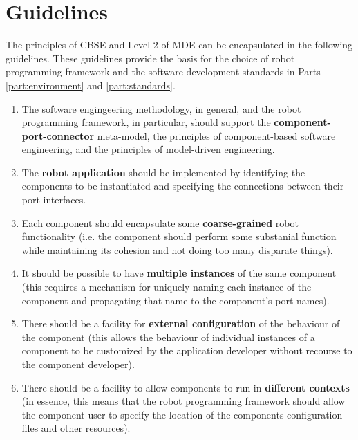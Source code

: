 \documentclass{CSSRforAfrica}
\begin{document}
\newpage

\section{Guidelines}
\label{section:guidelines}
The principles of CBSE and Level 2 of MDE can be encapsulated in the following guidelines.  These guidelines provide the basis for the choice of robot programming framework and the software development standards in Parts \ref{part:environment} and \ref{part:standards}.

\begin{enumerate}

\item The software engingeering methodology, in general, and the robot programming framework, in particular, should support the {\bf component-port-connector} meta-model,  the principles of component-based software engineering, and the principles of model-driven engineering.

\item The {\bf robot application} should be implemented by identifying the components to be instantiated and specifying the connections between their port interfaces.

\item Each component should encapsulate some  {\bf coarse-grained} robot functionality (i.e. the component should perform some substanial function while maintaining its cohesion and not doing too many disparate things).

\item It should be possible to have {\bf multiple instances} of the same component (this requires a mechanism for uniquely naming each instance of the component and propagating that name to the component's port names).

\item There should be a facility for {\bf external configuration} of the behaviour of the component (this allows the behaviour of individual instances of a component to be customized by the application developer without recourse to the component developer).

\item There should be a facility to allow components to run in {\bf different contexts} (in essence, this means that the robot programming framework should allow the component user to specify the location of the components configuration files and other resources).


\end{enumerate}
\end{document}
